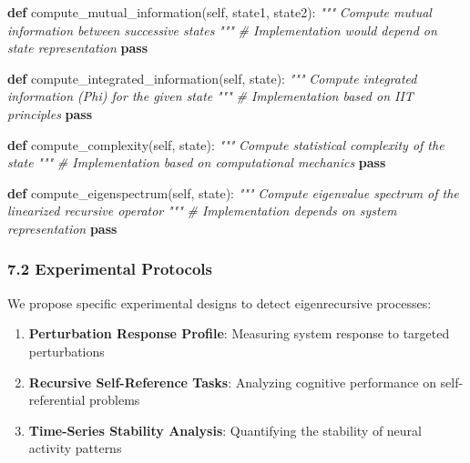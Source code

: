 \documentclass[
]{article}
\newenvironment{Shaded}{}{}
\newcommand{\CommentTok}[1]{\textcolor[rgb]{0.38,0.63,0.69}{\textit{#1}}}
\newcommand{\ControlFlowTok}[1]{\textcolor[rgb]{0.00,0.44,0.13}{\textbf{#1}}}
\newcommand{\KeywordTok}[1]{\textcolor[rgb]{0.00,0.44,0.13}{\textbf{#1}}}
\newcommand{\NormalTok}[1]{#1}
\newcommand{\VariableTok}[1]{\textcolor[rgb]{0.10,0.09,0.49}{#1}}
\providecommand{\tightlist}{%
  \setlength{\itemsep}{0pt}\setlength{\parskip}{0pt}}
\begin{document}
\begin{Shaded}
\begin{Highlighting}[]
    \KeywordTok{def}\NormalTok{ compute\_mutual\_information(}\VariableTok{self}\NormalTok{, state1, state2):}
        \CommentTok{"""}
\CommentTok{        Compute mutual information between successive states}
\CommentTok{        """}
        \CommentTok{\# Implementation would depend on state representation}
        \ControlFlowTok{pass}

    \KeywordTok{def}\NormalTok{ compute\_integrated\_information(}\VariableTok{self}\NormalTok{, state):}
        \CommentTok{"""}
\CommentTok{        Compute integrated information (Phi) for the given state}
\CommentTok{        """}
        \CommentTok{\# Implementation based on IIT principles}
        \ControlFlowTok{pass}

    \KeywordTok{def}\NormalTok{ compute\_complexity(}\VariableTok{self}\NormalTok{, state):}
        \CommentTok{"""}
\CommentTok{        Compute statistical complexity of the state}
\CommentTok{        """}
        \CommentTok{\# Implementation based on computational mechanics}
        \ControlFlowTok{pass}

    \KeywordTok{def}\NormalTok{ compute\_eigenspectrum(}\VariableTok{self}\NormalTok{, state):}
        \CommentTok{"""}
\CommentTok{        Compute eigenvalue spectrum of the linearized recursive operator}
\CommentTok{        """}
        \CommentTok{\# Implementation depends on system representation}
        \ControlFlowTok{pass}
\end{Highlighting}
\end{Shaded}

\subsubsection{7.2 Experimental Protocols}\label{experimental-protocols}

We propose specific experimental designs to detect eigenrecursive
processes:

\begin{enumerate}
\def\labelenumi{\arabic{enumi}.}
\tightlist
\item
  \textbf{Perturbation Response Profile}: Measuring system response to
  targeted perturbations
\item
  \textbf{Recursive Self-Reference Tasks}: Analyzing cognitive
  performance on self-referential problems
\item
  \textbf{Time-Series Stability Analysis}: Quantifying the stability of
  neural activity patterns
\end{enumerate}
\end{document}
